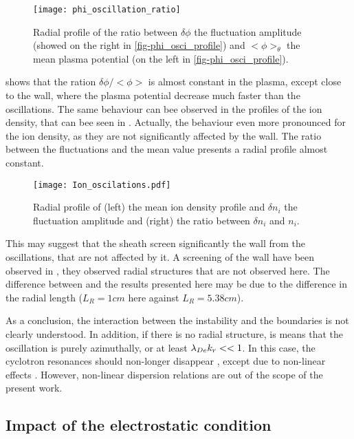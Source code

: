   \begin{figure}[hbtp]
    \centering
    \texttt{[image: phi\_oscillation\_ratio]}
    \caption{Radial profile of the ratio between $\delta \phi$ the fluctuation amplitude (showed on the right in \cref{fig-phi_osci_profile}) and $<\phi>_{\theta}$  the mean plasma potential (on the left in \cref{fig-phi_osci_profile}).}
    \label{fig-ratio}
  \end{figure}
  
   shows that the ration $\delta \phi / <\phi>$ is almost constant in the plasma, except close to the wall, where the plasma potential decrease much faster than the oscillations.
  The same behaviour can bee observed in the profiles of the ion density, that can bee seen in .
  Actually, the behaviour even more pronounced for the ion density, as they are not significantly affected by the wall.
  The ratio between the fluctuations and the mean value presents a radial profile almost constant.
  
  \begin{figure}[hbtp]
    \centering
    \texttt{[image: Ion\_oscilations.pdf]}
    \caption{Radial profile of (left) the mean ion density profile and $\delta n_i$ the fluctuation amplitude and (right) the ratio between $\delta n_i$ and $n_i$.}
    \label{fig-ion_oscilation}
  \end{figure}
  
  \vspace{1em}
  This may suggest that the sheath screen significantly the wall from the oscillations, that are not affected by it.
  A screening of the wall have been observed in \citet{janhunen2018}, they observed radial structures that are not observed here.
  The difference between  \citet{janhunen2018} and the results presented here may be due to the difference in the radial length ($L_R = 1cm$ here against $L_R = 5.38cm$).
  
  As a conclusion, the interaction between the instability and the boundaries is not clearly understood.
  In addition, if there is no radial structure, is means that the oscillation is purely azimuthally, or at least $\lambda_{De} k_r <<1$.
  In this case, the cyclotron resonances should non-longer disappear \citep{ducrocq2006}, except due to non-linear effects \citep{taccogna2018}.
  However, non-linear dispersion relations are out of the scope of the present work.
  
  
  \subsection{Impact of the electrostatic condition}
  \label{subsec-BC}
  
